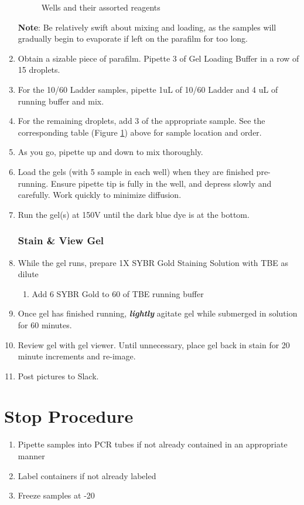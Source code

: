 \documentclass{ssiBio}
\begin{document}
\begin{enumerate}
\begin{figure}[ht]
\begin{center}
\begin{tabular}{|l|l|}
\end{tabular}
\label{tab:Gel Layout} %
\caption{Wells and their assorted reagents} %
\end{center}
\end{figure}
\textbf{Note}: Be relatively swift about mixing and loading, as the samples will gradually begin to evaporate if left on the parafilm for too long.
\item{Obtain a sizable piece of parafilm. Pipette 3 \uL{} of Gel Loading Buffer in a row of 15 droplets.}
\item{For the 10/60 Ladder samples, pipette 1uL of 10/60 Ladder and 4 uL of running buffer and mix.}
\item{For the remaining droplets, add 3 \uL{} of the appropriate sample. See the corresponding table (Figure \ref{tab:Gel Layout}) above for sample location and order.}
\item{As you go, pipette up and down to mix thoroughly.}
\item{Load the gels (with 5 \uL{} sample in each well) when they are finished pre-running. Ensure pipette tip is fully in the well, and depress slowly and carefully. Work quickly to minimize diffusion.}
\item{Run the gel(s) at 150V until the dark blue dye is at the bottom.}

\subsubsection{Stain \& View Gel}
\item{While the gel runs, prepare 1X SYBR Gold Staining Solution with TBE as dilute}
	\begin{enumerate}
		\item{Add 6\uL{} SYBR Gold to 60\uL{} of TBE running buffer}
	\end{enumerate}
\item{Once gel has finished running, \textbf{\textit{lightly}} agitate gel while submerged in solution for 60 minutes.}
\item{Review gel with gel viewer. Until unnecessary, place gel back in stain for 20 minute increments and re-image.}
\item{Post pictures to Slack.}\\
\end{enumerate} 

\section*{Stop Procedure}
\begin{enumerate}
\item{Pipette samples into PCR tubes if not already contained in an appropriate manner}
\item{Label containers if not already labeled}
\item{Freeze samples at -20\C{}}
\end{enumerate}



\end{document}
